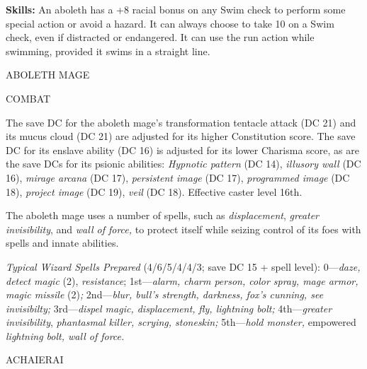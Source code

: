 \documentclass{article}
\begin{document}
\textbf{Skills:} An aboleth has a +8 racial bonus on any Swim check to perform 
some special action or avoid a hazard. It can always choose to take 10 on a Swim 
check, even if distracted or endangered. It can use the run action while swimming, 
provided it swims in a straight line.

\vspace{12pt}
ABOLETH MAGE

COMBAT

The save DC for the aboleth mage's transformation tentacle attack (DC 21) and its 
mucus cloud (DC 21) are adjusted for its higher Constitution score. The save DC 
for its enslave ability (DC 16) is adjusted for its lower Charisma score, as are 
the save DCs for its psionic abilities: \textit{Hypnotic pattern }(DC 14), \textit{illusory 
wall }(DC 16), \textit{mirage arcana }(DC 17), \textit{persistent image }(DC 17), 
\textit{programmed image }(DC 18), \textit{project image }(DC 19), \textit{veil 
}(DC 18). Effective caster level 16th.

The aboleth mage uses a number of spells, such as \textit{displacement}, \textit{greater 
invisibility}, and \textit{wall of force, }to protect itself while seizing control 
of its foes with spells and innate abilities.

\textit{Typical Wizard Spells Prepared }(4/6/5/4/4/3; save DC 15 + spell level): 
0---\textit{daze, detect magic }(2), \textit{resistance}; 1st---\textit{alarm, 
charm person, color spray, mage armor, magic missile }(2)\textit{; }2nd---\textit{blur, 
bull's strength, darkness, fox's cunning, see invisibilty; }3rd---\textit{dispel 
magic, displacement,} \textit{fly, lightning bolt; }4th---\textit{greater invisibility}, 
\textit{phantasmal killer, scrying, stoneskin; }5th---\textit{hold monster, }empowered 
\textit{lightning bolt, wall of force.}

\vspace{12pt}
{\LARGE{}ACHAIERAI}
\end{document}
